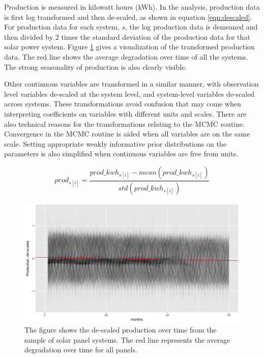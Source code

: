 \documentclass[a4paper]{article}
\begin{document}
Production is measured in kilowatt hours (kWh). In the analysis, production data is first log transformed and then de-scaled, as shown in equation \ref{eqn:descaled}. For production data for each system, $s$, the log production data is demeaned and then divided by 2 times the standard deviation of the production data for that solar power system. Figure \ref{fig:production} gives a visualization of the transformed production data. The red line shows the average degradation over time of all the systems. The strong seasonality of production is also clearly visible.

Other continuous variables are transformed in a similar manner, with observation level variables de-scaled at the system level, and system-level variables de-scaled across systems. These transformations avoid confusion that may come when interpreting coefficients on variables with different units and scales. There are also technical reasons for the transformations relating to the MCMC routine. Convergence in the MCMC routine is aided when all variables are on the same scale. Setting appropriate weakly informative prior distributions on the parameters is also simplified when continuous variables are free from units.

\begin{equation}
prod_{s[i]} = \frac{prod\_kwh_{s[i]} - mean(prod\_kwh_{s[i]})}{std(prod\_kwh_{s[i]})}
\label{eqn:descaled}
\end{equation}

\begin{figure}
  \includegraphics[width=1\linewidth]{figures/production.png}
  \caption{The figure shows the de-scaled production over time from the sample of solar panel systems. The red line represents the average degradation over time for all panels.}
  \label{fig:production}
\end{figure}
\end{document}
